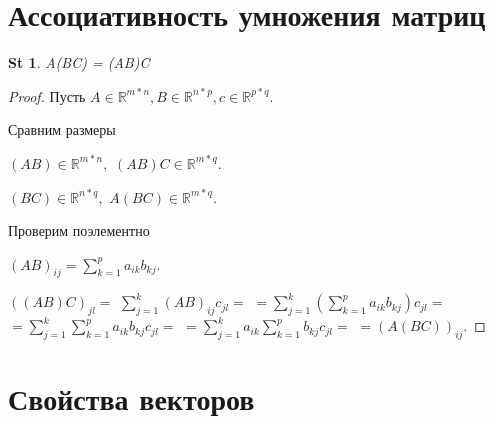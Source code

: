 \documentclass[a5paper, 10pt]{article}
\theoremstyle{plain}
\newtheorem*{statement}{St}
\newcommand{\R}{\mathbb R}
\begin{document}
	\author{\\(Конспектировал Иван-Чай)}
	\date{}
	\title{}

	\linespread{1.4}
	\selectfont

	\maketitle
	\newpage

	\tableofcontents

    \section{Ассоциативность умножения матриц}

    \begin{statement}
    A(BC) = (AB)C
    \end{statement}

    \begin{proof}
        Пусть $ A \in \R^{m * n}, B \in \R^{n * p}, c \in \R^{p * q} $. \newline

        Сравним размеры

        $ (AB) \in \R^{m * n}, $
        $ (AB)C \in \R^{m * q} $.

        $ (BC) \in \R^{n * q}, $
        $ A(BC) \in \R^{m * q} $.

        Проверим поэлементно

        $ (AB)_{ij} = \sum_{k=1}^p a_{ik} b_{kj} $.

        $ ((AB)C)_{jl} = $
        $ \sum_{j = 1}^k (AB)_{ij} c_{jl} = $ \newline
        $ = \sum_{j = 1}^k (\sum_{k=1}^p a_{ik} b_{kj}) c_{jl} = $ \newline
        $ = \sum_{j = 1}^k \sum_{k=1}^p a_{ik} b_{kj} c_{jl} = $ \newline
        $ = \sum_{j = 1}^k a_{ik} \sum_{k=1}^p b_{kj} c_{jl} = $ \newline
        $ = (A(BC))_{ij} $.

    \end{proof}

    \section{Свойства векторов}
\end{document}
